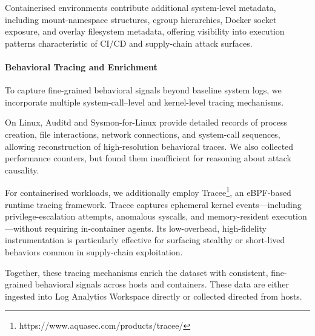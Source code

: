Containerised environments contribute additional system-level metadata, including mount-namespace structures, cgroup hierarchies, Docker socket exposure, and overlay filesystem metadata, offering visibility into execution patterns characteristic of CI/CD and supply-chain attack surfaces.

\paragraph{Behavioral Tracing and Enrichment}

To capture fine-grained behavioral signals beyond baseline system logs, we incorporate multiple system-call–level and kernel-level tracing mechanisms.

On Linux, Auditd and Sysmon-for-Linux provide detailed records of process creation, file interactions, network connections, and system-call sequences, allowing reconstruction of high-resolution behavioral traces. We also collected performance counters, but found them insufficient for reasoning about attack causality.

For containerised workloads, we additionally employ Tracee\footnote{https://www.aquasec.com/products/tracee/}, an eBPF-based runtime tracing framework. Tracee captures ephemeral kernel events—including privilege-escalation attempts, anomalous syscalls, and memory-resident execution—without requiring in-container agents. Its low-overhead, high-fidelity instrumentation is particularly effective for surfacing stealthy or short-lived behaviors common in supply-chain exploitation.

Together, these tracing mechanisms enrich the dataset with consistent, fine-grained behavioral signals across hosts and containers. These data are either ingested into Log Analytics Workspace directly or collected directed from hosts.
